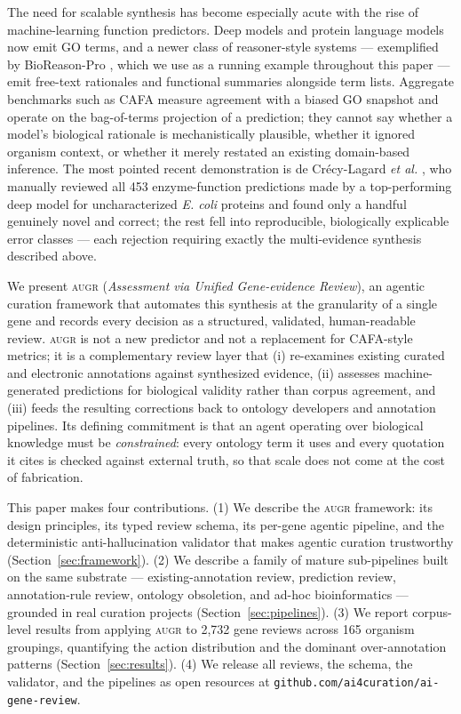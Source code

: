 \documentclass[11pt]{article}
\newcommand{\augr}{\textsc{augr}}
\newcommand{\code}[1]{\texttt{#1}}
\begin{document}
The need for scalable synthesis has become especially acute with the rise of
machine-learning function predictors. Deep models and protein language models
\cite{lin2023,kulmanov2020} now emit GO terms, and a newer class of
reasoner-style systems --- exemplified by BioReason-Pro \cite{fallahpour2026},
which we use as a running example throughout this paper --- emit free-text
rationales and functional summaries alongside term lists. Aggregate benchmarks
such as CAFA \cite{radivojac2013,jiang2016,zhou2019} measure agreement with a
biased GO snapshot and operate on the bag-of-terms projection of a prediction;
they cannot say whether a model's biological rationale is mechanistically
plausible, whether it ignored organism context, or whether it merely restated an
existing domain-based inference. The most pointed recent demonstration is de
Cr\'ecy-Lagard \emph{et al.} \cite{decrecylagard2025}, who manually reviewed all
453 enzyme-function predictions made by a top-performing deep model for
uncharacterized \emph{E. coli} proteins and found only a handful genuinely novel
and correct; the rest fell into reproducible, biologically explicable error
classes --- each rejection requiring exactly the multi-evidence synthesis
described above.

We present \augr{} (\emph{Assessment via Unified Gene-evidence Review}), an
agentic curation framework that automates this synthesis at the granularity of a
single gene and records every decision as a structured, validated, human-readable
review. \augr{} is not a new predictor and not a replacement for CAFA-style
metrics; it is a complementary review layer that (i) re-examines existing curated
and electronic annotations against synthesized evidence, (ii) assesses
machine-generated predictions for biological validity rather than corpus
agreement, and (iii) feeds the resulting corrections back to ontology developers
and annotation pipelines. Its defining commitment is that an agent operating over
biological knowledge must be \emph{constrained}: every ontology term it uses and
every quotation it cites is checked against external truth, so that scale does not
come at the cost of fabrication.

This paper makes four contributions. (1) We describe the \augr{} framework: its
design principles, its typed review schema, its per-gene agentic pipeline, and the
deterministic anti-hallucination validator that makes agentic curation trustworthy
(Section~\ref{sec:framework}). (2) We describe a family of mature sub-pipelines
built on the same substrate --- existing-annotation review, prediction review,
annotation-rule review, ontology obsoletion, and ad-hoc bioinformatics ---
grounded in real curation projects (Section~\ref{sec:pipelines}). (3) We report
corpus-level results from applying \augr{} to 2{,}732 gene reviews across 165
organism groupings, quantifying the action distribution and the dominant
over-annotation patterns (Section~\ref{sec:results}). (4) We release all reviews,
the schema, the validator, and the pipelines as open resources at
\code{github.com/ai4curation/ai-gene-review}.
\end{document}
